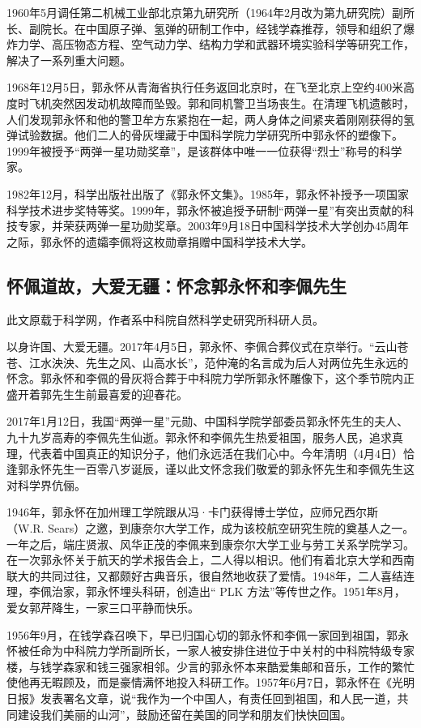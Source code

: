 1960年5月调任第二机械工业部北京第九研究所（1964年2月改为第九研究院）副所长、副院长。在中国原子弹、氢弹的研制工作中，经钱学森推荐，领导和组织了爆炸力学、高压物态方程、空气动力学、结构力学和武器环境实验科学等研究工作，解决了一系列重大问题。

1968年12月5日，郭永怀从青海省执行任务返回北京时，在飞至北京上空约400米高度时飞机突然因发动机故障而坠毁。郭和同机警卫当场丧生。在清理飞机遗骸时，人们发现郭永怀和他的警卫牟方东紧抱在一起，两人身体之间紧夹着刚刚获得的氢弹试验数据。他们二人的骨灰埋藏于中国科学院力学研究所中郭永怀的塑像下。1999年被授予“两弹一星功勋奖章”，是该群体中唯一一位获得“烈士”称号的科学家。

1982年12月，科学出版社出版了《郭永怀文集》。1985年，郭永怀补授予一项国家科学技术进步奖特等奖。1999年，郭永怀被追授予研制“两弹一星”有突出贡献的科技专家，并荣获两弹一星功勋奖章。2003年9月18日中国科学技术大学创办45周年之际，郭永怀的遗孀李佩将这枚勋章捐赠中国科学技术大学。

\subsection{怀佩道故，大爱无疆：怀念郭永怀和李佩先生}

此文原载于科学网，作者系中科院自然科学史研究所科研人员。

以身许国、大爱无疆。2017年4月5日，郭永怀、李佩合葬仪式在京举行。“云山苍苍、江水泱泱、先生之风、山高水长”，范仲淹的名言成为后人对两位先生永远的怀念。郭永怀和李佩的骨灰将合葬于中科院力学所郭永怀雕像下，这个季节院内正盛开着郭先生生前最喜爱的迎春花。

2017年1月12日，我国“两弹一星”元勋、中国科学院学部委员郭永怀先生的夫人、九十九岁高寿的李佩先生仙逝。郭永怀和李佩先生热爱祖国，服务人民，追求真理，代表着中国真正的知识分子，他们永远活在我们心中。今年清明（4月4日）恰逢郭永怀先生一百零八岁诞辰，谨以此文怀念我们敬爱的郭永怀先生和李佩先生这对科学界伉俪。

1946年，郭永怀在加州理工学院跟从冯·卡门获得博士学位，应师兄西尔斯（W.R. Sears）之邀，到康奈尔大学工作，成为该校航空研究生院的奠基人之一。一年之后，端庄贤淑、风华正茂的李佩来到康奈尔大学工业与劳工关系学院学习。在一次郭永怀关于航天的学术报告会上，二人得以相识。他们有着北京大学和西南联大的共同过往，又都颇好古典音乐，很自然地收获了爱情。1948年，二人喜结连理，李佩治家，郭永怀埋头科研，创造出“ PLK 方法”等传世之作。1951年8月，爱女郭芹降生，一家三口平静而快乐。

1956年9月，在钱学森召唤下，早已归国心切的郭永怀和李佩一家回到祖国，郭永怀被任命为中科院力学所副所长，一家人被安排住进位于中关村的中科院特级专家楼，与钱学森家和钱三强家相邻。少言的郭永怀本来酷爱集邮和音乐，工作的繁忙使他再无暇顾及，而是豪情满怀地投入科研工作。1957年6月7日，郭永怀在《光明日报》发表署名文章，说“我作为一个中国人，有责任回到祖国，和人民一道，共同建设我们美丽的山河”，鼓励还留在美国的同学和朋友们快快回国。

